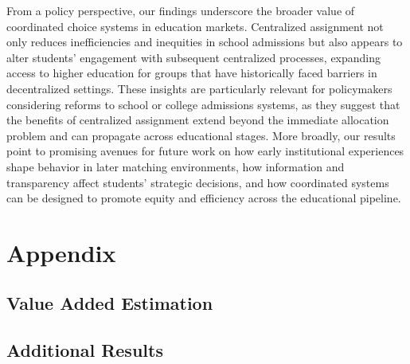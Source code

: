 \documentclass[11pt]{article}
\begin{document}
From a policy perspective, our findings underscore the broader value of coordinated choice systems in education markets. Centralized assignment not only reduces inefficiencies and inequities in school admissions but also appears to alter students' engagement with subsequent centralized processes, expanding access to higher education for groups that have historically faced barriers in decentralized settings. These insights are particularly relevant for policymakers considering reforms to school or college admissions systems, as they suggest that the benefits of centralized assignment extend beyond the immediate allocation problem and can propagate across educational stages. More broadly, our results point to promising avenues for future work on how early institutional experiences shape behavior in later matching environments, how information and transparency affect students' strategic decisions, and how coordinated systems can be designed to promote equity and efficiency across the educational pipeline.


   


\section{Appendix}

\subsection{Value Added Estimation}\label{app: value added estimation}

\subsection{Additional Results}\label{app: additional results}






\end{document}

